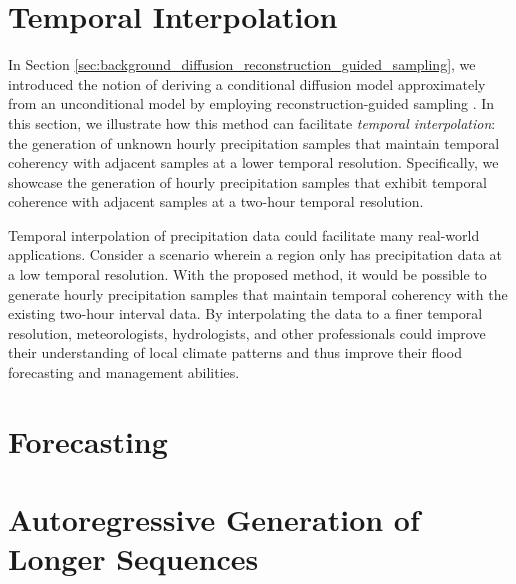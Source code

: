 \documentclass[ oneside,%
                    author={George Herbert},
                    degree={MSci},
                     title={Video Diffusion Models for Climate Simulations},
                  subtitle={}]{dissertation}
\begin{document}

\section{Temporal Interpolation}

In Section \ref{sec:background_diffusion_reconstruction_guided_sampling}, we introduced the notion of deriving a conditional diffusion model approximately from an unconditional model by employing reconstruction-guided sampling \cite{VDM_Ho}. In this section, we illustrate how this method can facilitate \textit{temporal interpolation}: the generation of unknown hourly precipitation samples that maintain temporal coherency with adjacent samples at a lower temporal resolution. Specifically, we showcase the generation of hourly precipitation samples that exhibit temporal coherence with adjacent samples at a two-hour temporal resolution. 




Temporal interpolation of precipitation data could facilitate many real-world applications. Consider a scenario wherein a region only has precipitation data at a low temporal resolution. With the proposed method, it would be possible to generate hourly precipitation samples that maintain temporal coherency with the existing two-hour interval data. By interpolating the data to a finer temporal resolution, meteorologists, hydrologists, and other professionals could improve their understanding of local climate patterns and thus improve their flood forecasting and management abilities.

\section{Forecasting}

\section{Autoregressive Generation of Longer Sequences}

\end{document}
